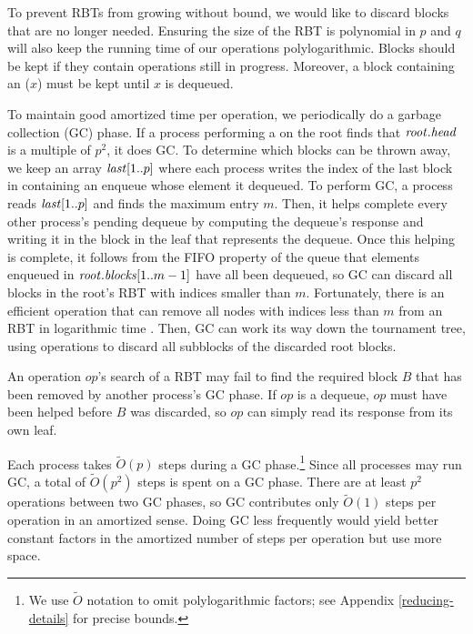 To prevent RBTs from growing without bound, we would like to discard
blocks that are no longer needed.
Ensuring the size of the RBT is polynomial in $p$ and $q$ will 
also keep the running time of our operations polylogarithmic.
Blocks should be kept if they contain operations still in progress.
Moreover, a block containing an ($x$) must be kept until $x$ is dequeued.

To maintain good amortized time per operation, we periodically do a garbage collection (GC) phase.
If a process performing a  on the root finds that $\mbox{\textnormal{\textit{root}}}.\mbox{\textit{head}}$ is a multiple
of $p^2$, it does GC.
To determine which blocks can be thrown away, we keep an array $\mbox{\textnormal{\textit{last}}}[1..p]$ where 
each process writes the index of the last block in
 containing an enqueue whose element it dequeued.
To perform GC, a process reads $\mbox{\textnormal{\textit{last}}}[1..p]$ and finds the maximum entry $m$.
Then, it helps complete every other process's pending dequeue 
by computing the dequeue's response and writing it in the block in the leaf that represents the dequeue.
Once this helping is complete, it follows from the FIFO property of the queue that elements enqueued 
in $\mbox{\textnormal{\textit{root}}}.\mbox{\textit{blocks}}[1..m-1]$ have all been dequeued, so GC can discard all blocks in the root's RBT 
with indices smaller than $m$.
Fortunately, there is an efficient  operation that can remove
all nodes with indices less than $m$ from an RBT in logarithmic time \cite[Sec.~4.2]{Tar83}.
Then, GC can work its way down the tournament tree, using  operations to discard all subblocks
of the discarded root blocks.


An operation $op$'s search of a RBT may fail to find the required block $B$ that has been removed 
by another process's GC phase.  If $op$
is a dequeue, $op$ must have been helped before $B$ was discarded, so $op$ can simply read its response from
its own leaf.

Each process takes $\tilde{O}(p)$ steps during a GC phase.\footnote{We use $\tilde{O}$ notation
to omit polylogarithmic factors; see Appendix \ref{reducing-details} for precise bounds.}
Since all processes may run GC,
a total of $\tilde{O}(p^2)$ steps is spent on a GC phase.
There are at least $p^2$ operations between two GC phases,  so
GC contributes only $\tilde{O}(1)$ steps per operation in an amortized sense.
Doing GC less frequently would yield better constant factors in the amortized number of steps per operation but use more space.

